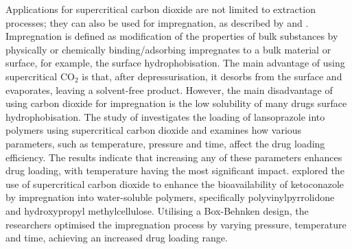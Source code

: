 \documentclass[a4paper,fleqn]{cas-dc}
\begin{document}
Applications for supercritical carbon dioxide are not limited to extraction processes; they can also be used for impregnation, as described by \citet{Weidner2018} and \citet{Machado2022}. Impregnation is defined as modification of the properties of bulk substances by physically or chemically binding/adsorbing impregnates to a bulk material or surface, for example, the surface hydrophobisation. The main advantage of using supercritical CO$_2$ is that, after depressurisation, it desorbs from the surface and evaporates, leaving a solvent-free product. However, the main disadvantage of using carbon dioxide for impregnation is the low solubility of many drugs surface hydrophobisation. 
The study of \citet{Ameri2020} investigates the loading of lansoprazole into polymers using supercritical carbon dioxide and examines how various parameters, such as temperature, pressure and time, affect the drug loading efficiency. The results indicate that increasing any of these parameters enhances drug loading, with temperature having the most significant impact. \citet{Fathi2022} explored the use of supercritical carbon dioxide to enhance the bioavailability of ketoconazole by impregnation into water-soluble polymers, specifically polyvinylpyrrolidone and hydroxypropyl methylcellulose. Utilising a Box-Behnken design, the researchers optimised the impregnation process by varying pressure, temperature and time, achieving an increased drug loading range.
\end{document}
